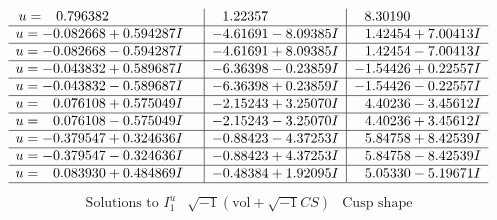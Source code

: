 \documentclass[1p]{elsarticle_modified}
\theoremstyle{definition}
\newcommand{\I}{\sqrt{-1}}
\begin{document}
$$\begin{array}{c|c|c}
\begin{aligned}
u &= \phantom{-}0.796382\phantom{ +0.000000I}\end{aligned}
 & \phantom{-}1.22357\phantom{ +0.000000I} & \phantom{-}8.30190\phantom{ +0.000000I} \\ \hline\begin{aligned}
u &= -0.082668 + 0.594287 I\end{aligned}
 & -4.61691 - 8.09385 I & \phantom{-}1.42454 + 7.00413 I \\ \hline\begin{aligned}
u &= -0.082668 - 0.594287 I\end{aligned}
 & -4.61691 + 8.09385 I & \phantom{-}1.42454 - 7.00413 I \\ \hline\begin{aligned}
u &= -0.043832 + 0.589687 I\end{aligned}
 & -6.36398 - 0.23859 I & -1.54426 + 0.22557 I \\ \hline\begin{aligned}
u &= -0.043832 - 0.589687 I\end{aligned}
 & -6.36398 + 0.23859 I & -1.54426 - 0.22557 I \\ \hline\begin{aligned}
u &= \phantom{-}0.076108 + 0.575049 I\end{aligned}
 & -2.15243 + 3.25070 I & \phantom{-}4.40236 - 3.45612 I \\ \hline\begin{aligned}
u &= \phantom{-}0.076108 - 0.575049 I\end{aligned}
 & -2.15243 - 3.25070 I & \phantom{-}4.40236 + 3.45612 I \\ \hline\begin{aligned}
u &= -0.379547 + 0.324636 I\end{aligned}
 & -0.88423 - 4.37253 I & \phantom{-}5.84758 + 8.42539 I \\ \hline\begin{aligned}
u &= -0.379547 - 0.324636 I\end{aligned}
 & -0.88423 + 4.37253 I & \phantom{-}5.84758 - 8.42539 I \\ \hline\begin{aligned}
u &= \phantom{-}0.083930 + 0.484869 I\end{aligned}
 & -0.48384 + 1.92095 I & \phantom{-}5.05330 - 5.19671 I\\
 \hline 
 \end{array}$$\newpage$$\begin{array}{c|c|c}  
\text{Solutions to }I^u_{1}& \I (\text{vol} + \sqrt{-1}CS) & \text{Cusp shape}\\

\end{array}$$
\end{document}
